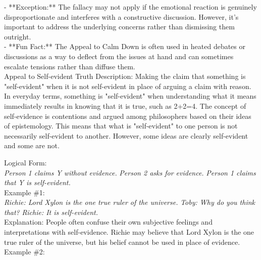 \documentclass[a4paper,12pt,single,pdftex]{scrartcl}
\begin{document}
    
      - **Exception:** The fallacy may not apply if the emotional reaction is genuinely disproportionate and interferes with a constructive discussion. However, it's important to address the underlying concerns rather than dismissing them outright.
    \\

    
      - **Fun Fact:** The Appeal to Calm Down is often used in heated debates or discussions as a way to deflect from the issues at hand and can sometimes escalate tensions rather than diffuse them.
    \\

  

Appeal to Self-evident Truth
    Description: Making the claim that something is "self-evident" when it is not self-evident in place of arguing a claim with reason. In everyday terms, something is "self-evident" when understanding what it means immediately results in knowing that it is true, such as 2+2=4. The concept of self-evidence is contentions and argued among philosophers based on their ideas of epistemology. This means that what is "self-evident" to one person is not necessarily self-evident to another. However, some ideas are clearly self-evident and some are not.

    
      Logical Form:
    \\

    
      {\em Person 1 claims Y without evidence.} \newline
{\em Person 2 asks for evidence.} \newline
{\em Person 1 claims that Y is self-evident.}
    \\

    
      Example \#1:
    \\

    
      {\em Richie: Lord Xylon is the one true ruler of the universe.} \newline
{\em Toby: Why do you think that?} \newline
{\em Richie: It is self-evident.}
    \\

    
      Explanation: People often confuse their own subjective feelings and interpretations with self-evidence. Richie may believe that Lord Xylon is the one true ruler of the universe, but his belief cannot be used in place of evidence.
    \\

    
      Example \#2:
    \\
\end{document}
